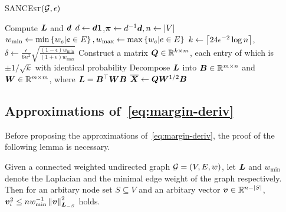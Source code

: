 \documentclass[sigconf]{acmart}
\begin{document}
\begin{algorithm}
    \caption{\textsc{SANCEst}\((\mathcal{G},\epsilon)\)}
    \label{algo:sancest}
    Compute \(\boldsymbol{L}\) and \(\boldsymbol{d}\)\;
    \(d\gets\boldsymbol{d}\boldsymbol{1}\),\(\boldsymbol{\pi}\gets d^{-1}\boldsymbol{d},n\gets\left|V \right|\)\;
    \(w_{\min}\gets\min\left\{w_e|e\in E \right\},w_{\max}\gets\max\left\{w_e|e\in E \right\}\)\;
    \(k\gets\left\lceil24\epsilon^{-2}\log n\right\rceil\),\(\delta\gets\frac{\epsilon}{6n^2}\sqrt{\frac{(1-\epsilon)w_{\min}}{(1+\epsilon)w_{\max}}}\)\;
    Construct a matrix \(\boldsymbol{Q}\in\mathbb{R}^{k\times m}\), each entry of which is \(\pm1/\sqrt k\) with identical probability\;
    Decompose \(\boldsymbol{L}\) into \(\boldsymbol{B}\in\mathbb{R}^{m\times n}\) and \(\boldsymbol{W}\in\mathbb{R}^{m\times m}\), where \(\boldsymbol{L}=\boldsymbol{B}^\top\boldsymbol{W}\boldsymbol{B}\)\;
    \(\overline{\boldsymbol{X}}\gets\boldsymbol{Q}\boldsymbol{W}^{1/2}\boldsymbol{B}\)\;

\end{algorithm}

\subsection{Approximations of~\eqref{eq:margin-deriv}}

Before proposing the approximations of~\eqref{eq:margin-deriv}, the proof of the following lemma is necessary.
\begin{lemma}\label{lem:norm-ineq}
    Given a connected weighted undirected graph \(\mathcal{G}=(V,E,w)\), let \(\boldsymbol{L}\) and \(w_{\min}\) denote the Laplacian and the minimal edge weight of the graph respectively.
    Then for an arbitary node set \(S\subseteq V\) and an arbitary vector \(\boldsymbol{v}\in\mathbb{R}^{n-\left|S \right|}\), \(\boldsymbol{v}_i^2\le nw_{\min}^{-1}\left\Vert\boldsymbol{v}\right\Vert^2_{\boldsymbol{L}_{-S}}\) holds.
\end{lemma}
\end{document}
